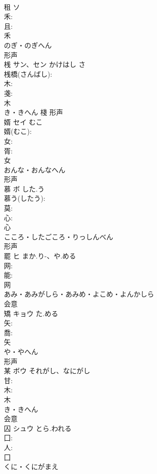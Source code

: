 \documentclass[8pt]{extreport}
\begin{document}
\begin{CJK}{UTF8}{min}
\\	租	ソ			
\\	禾: 
\\	且: 
\\	禾	
\\	のぎ・のぎへん	
\\	形声 
\\	桟	サン、セン	かけはし	さ	
\\	桟橋(さんばし): 
\\	木: 
\\	戔: 
\\	木	
\\	き・きへん	棧	形声 
\\	婿	セイ	むこ		
\\	婿(むこ): 
\\	女: 
\\	胥: 
\\	女	
\\	おんな・おんなへん	
\\	形声 
\\	慕	ボ	した.う		
\\	慕う(したう): 
\\	莫: 
\\	心: 
\\	心	
\\	こころ・したごころ・りっしんべん	
\\	形声 
\\	罷	ヒ	まか.り-、や.める		
\\	网: 
\\	能: 
\\	网	
\\	あみ・あみがしら・あみめ・よこめ・よんかしら	
\\	会意 
\\	矯	キョウ	た.める		
\\	矢: 
\\	喬: 
\\	矢	
\\	や・やへん	
\\	形声 
\\	某	ボウ	それがし、なにがし		
\\	甘: 
\\	木: 
\\	木	
\\	き・きへん	
\\	会意 
\\	囚	シュウ	とら.われる		
\\	囗: 
\\	人: 
\\	囗	
\\	くに・くにがまえ	

\end{CJK}
\end{document}

